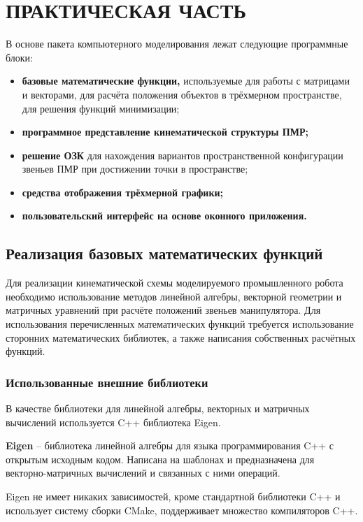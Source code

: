 \newpage
\section{ПРАКТИЧЕСКАЯ ЧАСТЬ}

В основе пакета компьютерного моделирования лежат следующие программные \mbox{блоки}:
\begin{itemize}
    \item \textbf{базовые математические функции,} используемые для работы с матрицами и векторами, для расчёта положения объектов в трёхмерном пространстве, для решения функций минимизации;
    \item \textbf{программное представление кинематической структуры ПМР;}
    \item \textbf{решение ОЗК} для нахождения вариантов пространственной конфигурации звеньев ПМР при достижении точки в пространстве;
    \item \textbf{средства отображения трёхмерной графики;}
    \item \textbf{пользовательский интерфейс на основе оконного приложения.}
\end{itemize}


\subsection{\textbf{Реализация базовых математических функций}}

Для реализации кинематической схемы моделируемого промышленного робота необходимо использование методов линейной алгебры, векторной геометрии и матричных уравнений при расчёте положений звеньев манипулятора. Для использования перечисленных математических функций требуется использование сторонних математических библиотек, а также написания собственных расчётных функций.

\subsubsection{\textbf{Использованные внешние библиотеки}}

В качестве библиотеки для линейной алгебры, векторных и матричных вычислений используется C++ библиотека Eigen\cite{Eigen_Lib}.

\textbf{Eigen} -- библиотека линейной алгебры для языка программирования C++ с открытым исходным кодом. Написана на шаблонах и предназначена для векторно-матричных вычислений и связанных с ними операций.

Eigen не имеет никаких зависимостей, кроме стандартной библиотеки C++ и использует систему сборки CMake, поддерживает множество компиляторов C++.

